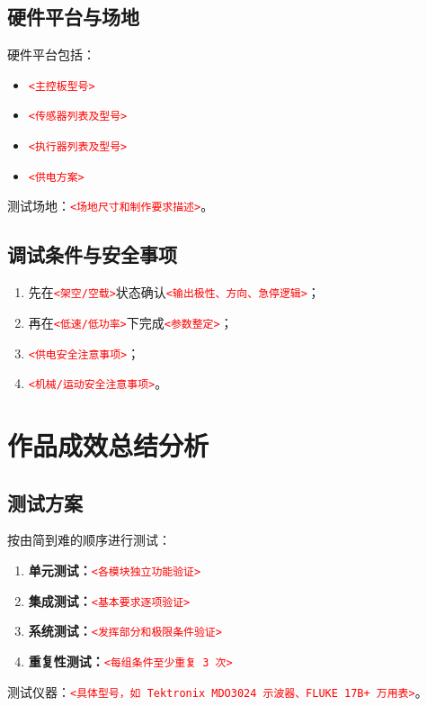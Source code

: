 \documentclass[12pt,a4paper,fontset=fandol]{ctexart}
\newcommand{\placeholder}[1]{\textcolor{red}{\texttt{<#1>}}}
\begin{document}
\subsection{硬件平台与场地}
硬件平台包括：
\begin{itemize}
  \item \placeholder{主控板型号}
  \item \placeholder{传感器列表及型号}
  \item \placeholder{执行器列表及型号}
  \item \placeholder{供电方案}
\end{itemize}
测试场地：\placeholder{场地尺寸和制作要求描述}。

\subsection{调试条件与安全事项}
\begin{enumerate}
  \item 先在\placeholder{架空/空载}状态确认\placeholder{输出极性、方向、急停逻辑}；
  \item 再在\placeholder{低速/低功率}下完成\placeholder{参数整定}；
  \item \placeholder{供电安全注意事项}；
  \item \placeholder{机械/运动安全注意事项}。
\end{enumerate}

\section{作品成效总结分析}

\subsection{测试方案}
按由简到难的顺序进行测试：
\begin{enumerate}
  \item \textbf{单元测试：}\placeholder{各模块独立功能验证}
  \item \textbf{集成测试：}\placeholder{基本要求逐项验证}
  \item \textbf{系统测试：}\placeholder{发挥部分和极限条件验证}
  \item \textbf{重复性测试：}\placeholder{每组条件至少重复 3 次}
\end{enumerate}
测试仪器：\placeholder{具体型号，如 Tektronix MDO3024 示波器、FLUKE 17B+ 万用表}。
\end{document}
